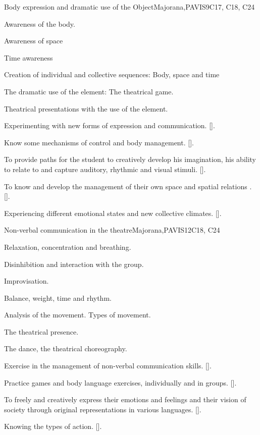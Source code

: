 \begin{syllabus}
\begin{unit}{}{Body expression and dramatic use of the Object}{Majorana,PAVIS}{9}{C17, C18, C24}
\begin{topics}
	\item Awareness of the body.
	\item Awareness of space
	\item Time awareness
	\item Creation of individual and collective sequences: Body, space and time
	\item The dramatic use of the element: The theatrical game.
	\item Theatrical presentations with the use of the element.

\end{topics}
\begin{learningoutcomes}
	\item Experimenting with new forms of expression and communication. [\Usage].
	\item Know some mechanisms of control and body management. [\Usage].
	\item To provide paths for the student to creatively develop his imagination, his ability to relate to and capture auditory, rhythmic and visual stimuli. [\Usage].
	\item To know and develop the management of their own space and spatial relations . [\Usage].
	\item Experiencing different emotional states and new collective climates. [\Usage].
\end{learningoutcomes}
\end{unit}

\begin{unit}{}{Non-verbal communication in the theatre}{Majorana,PAVIS}{12}{C18, C24}
\begin{topics}
	\item Relaxation, concentration and breathing.
	\item Disinhibition and interaction with the group.
	\item Improvisation.
	\item Balance, weight, time and rhythm.
	\item Analysis of the movement. Types of movement.
	\item The theatrical presence.
	\item The dance, the theatrical choreography.

\end{topics}
\begin{learningoutcomes}
	\item Exercise in the management of non-verbal communication skills. [\Usage].
	\item Practice games and body language exercises, individually and in groups. [\Usage].
	\item To freely and creatively express their emotions and feelings and their vision of society through original representations in various languages. [\Usage].
	\item Knowing the types of action. [\Usage].
\end{learningoutcomes}
\end{unit}


\end{syllabus}

